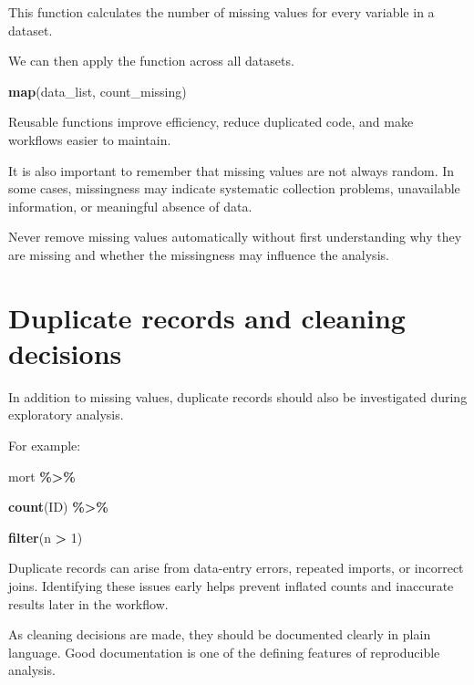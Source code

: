 \documentclass[
  11pt,
  oneside]{book}
\newenvironment{Shaded}{\begin{snugshade}}{\end{snugshade}}
\newcommand{\DecValTok}[1]{\textcolor[rgb]{0.00,0.00,0.81}{#1}}
\newcommand{\FunctionTok}[1]{\textcolor[rgb]{0.13,0.29,0.53}{\textbf{#1}}}
\newcommand{\NormalTok}[1]{#1}
\newcommand{\SpecialCharTok}[1]{\textcolor[rgb]{0.81,0.36,0.00}{\textbf{#1}}}
\begin{document}
This function calculates the number of missing values for every variable in a dataset.

We can then apply the function across all datasets.

\begin{Shaded}
\begin{Highlighting}[]
\FunctionTok{map}\NormalTok{(data\_list, count\_missing)}
\end{Highlighting}
\end{Shaded}

Reusable functions improve efficiency, reduce duplicated code, and make workflows easier to maintain.

It is also important to remember that missing values are not always random. In some cases, missingness may indicate systematic collection problems, unavailable information, or meaningful absence of data.

Never remove missing values automatically without first understanding why they are missing and whether the missingness may influence the analysis.

\section{Duplicate records and cleaning decisions}\label{duplicate-records-and-cleaning-decisions}

In addition to missing values, duplicate records should also be investigated during exploratory analysis.

For example:

\begin{Shaded}
\begin{Highlighting}[]
\NormalTok{mort }\SpecialCharTok{\%\textgreater{}\%}
  
  \FunctionTok{count}\NormalTok{(ID) }\SpecialCharTok{\%\textgreater{}\%}
  
  \FunctionTok{filter}\NormalTok{(n }\SpecialCharTok{\textgreater{}} \DecValTok{1}\NormalTok{)}
\end{Highlighting}
\end{Shaded}

Duplicate records can arise from data-entry errors, repeated imports, or incorrect joins. Identifying these issues early helps prevent inflated counts and inaccurate results later in the workflow.

As cleaning decisions are made, they should be documented clearly in plain language. Good documentation is one of the defining features of reproducible analysis.
\end{document}
